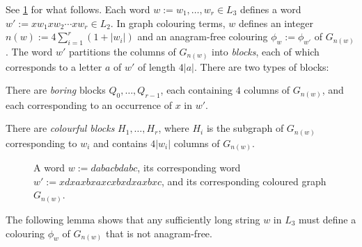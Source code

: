 \documentclass{patmorin}
\begin{document}

See \cref{bigexample} for what follows. Each word $w:=w_1,\ldots,w_r\in L_3$ defines a word $w':=xw_1xw_2\cdots xw_{r}\in L_2$.  In graph colouring terms, $w$ defines an integer $n(w):=4\sum_{i=1}^r(1+|w_i|)$ and an anagram-free colouring $\phi_w:=\phi_{w'}$ of $G_{n(w)}$. The word $w'$ partitions the columns of $G_{n(w)}$ into \emph{blocks}, each of which corresponds to a letter $a$ of $w'$ of length $4|a|$.  There are two types of blocks:
\begin{compactitem}
    \item There are \emph{boring} blocks $Q_0,\ldots,Q_{r-1}$, each containing $4$ columns of $G_{n(w)}$, and each corresponding to an occurrence of $x$ in $w'$.
    \item There are \emph{colourful blocks} $H_1,\ldots,H_r$, where $H_i$ is the subgraph of $G_{n(w)}$ corresponding to $w_i$ and contains $4|w_i|$ columns of $G_{n(w)}$.
\end{compactitem}

\begin{figure}
    \caption{A word $w:=dabacbdabc$, its corresponding word $w':=xdxaxbxaxcxbxdxaxbxc$, and its corresponding coloured graph $G_{n(w)}$.}
    \label{bigexample}
\end{figure}

The following lemma shows that any sufficiently long string $w$ in $L_3$ must define a colouring $\phi_w$ of $G_{n(w)}$ that is not anagram-free.


\end{document}
